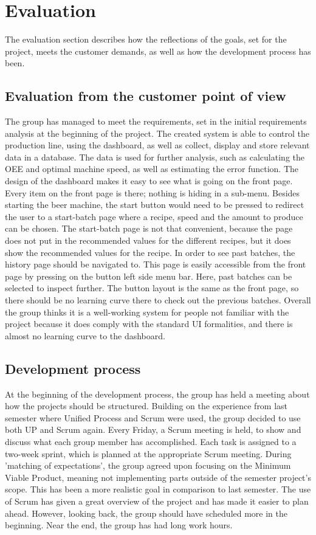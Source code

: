 \section{Evaluation}
The evaluation section describes how the reflections of the goals, set for the
project, meets the customer demands, as well as how the development process has
been.


\subsection{Evaluation from the customer point of view}
The group has managed to meet the requirements, set in the initial requirements
analysis at the beginning of the project. The created system is able to control
the production line, using the dashboard, as well as collect, display and
store relevant data in a database. The data is used for further analysis, such
as calculating the OEE and optimal machine speed, as well as estimating the
error function.
The design of the dashboard makes it easy to see what is going on the front page.
Every item on the front page is there; nothing is hiding in a sub-menu.
Besides starting the beer machine, the start button would need to be pressed
to redirect the user to a start-batch page where a recipe, speed and the amount
to produce can be chosen. The start-batch page is not that convenient, because
the page  does not put in the recommended values for the different recipes, but
it does show the recommended values for the recipe.
In order to see past batches, the history page should be navigated to. This page
is easily accessible from the front page by pressing on the button left
side menu bar. Here, past batches can be selected to inspect further. The button
layout is the same as the front page, so there should be no learning curve there
to check out the previous batches. Overall the group thinks it is a well-working
system for people not familiar with the project because it does comply with the
standard UI formalities, and there is almost no learning curve to the dashboard.


\subsection{Development process}
At the beginning of the development process, the group has held a meeting
about how the projects should be structured. Building on the experience from
last semester where Unified Process and Scrum were used, the group
decided to use both UP and Scrum again. Every Friday, a Scrum meeting is held,
to show and discuss what each group member has accomplished. Each task is
assigned to a two-week sprint, which is planned at the appropriate Scrum
meeting.
During 'matching of expectations', the group agreed upon focusing on the Minimum
Viable Product, meaning not implementing parts outside of the semester project's
scope. This has been a more realistic goal in comparison to last semester.
The use of Scrum has given a great overview of the project and has made it 
easier to plan ahead. However, looking back, the group should have scheduled 
more in the beginning. Near the end, the group has had long work hours.

